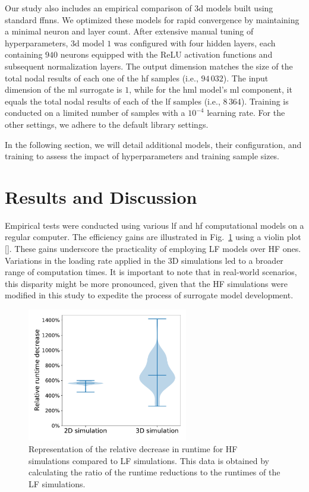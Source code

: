 \documentclass[12pt,a4paper]{report}
\begin{document}
Our study also includes an empirical comparison of \ac{3d} models built using standard \acp{ffnn}. We optimized these models for rapid convergence by maintaining a minimal neuron and layer count. After extensive manual tuning of hyperparameters, \ac{3d} model $1$ was configured with four hidden layers, each containing $940$ neurons equipped with the ReLU activation functions and subsequent normalization layers. The output dimension matches the size of the total nodal results of each one of the \ac{hf} samples (i.e., $94\,032$). The input dimension of the \ac{ml} surrogate is $1$, while for the \ac{hml} model's \ac{ml} component, it equals the total nodal results of each of the \ac{lf} samples (i.e., $8\,364$). Training is conducted on a limited number of samples with a $10^{-4}$ learning rate. For the other settings, we adhere to the default library settings.

In the following section, we will detail additional models, their configuration, and training to assess the impact of hyperparameters and training sample sizes.

\section{Results and Discussion}
%
Empirical tests were conducted using various \ac{lf} and \ac{hf} computational models on a regular computer. The efficiency gains are illustrated in Fig.~\ref{fig:runtime-comparison} using a violin plot [\cite{hintze1998}]. These gains underscore the practicality of employing LF models over HF ones. Variations in the loading rate applied in the 3D simulations led to a broader range of computation times. It is important to note that in real-world scenarios, this disparity might be more pronounced, given that the HF simulations were modified in this study to expedite the process of surrogate model development.
%
\begin{figure}\centering
\includegraphics[trim={0cm 0.5cm 0cm 0cm},clip,width=7cm]{comparison.pdf}
\caption{Representation of the relative decrease in runtime for HF simulations compared to LF simulations. This data is obtained by calculating the ratio of the runtime reductions to the runtimes of the LF simulations.\label{fig:runtime-comparison}}
\end{figure}
\end{document}
